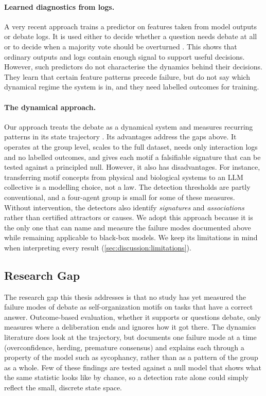 \paragraph{Learned diagnostics from logs.}
A very recent approach trains a predictor on features taken from model outputs
or debate logs. It is used either to decide whether a question needs debate at all
\citep{fan2026imad} or to decide when a majority vote should be overturned
\citep{minoritysentinel2026}. This shows that ordinary outputs and logs contain enough signal
to support useful decisions. However, such predictors do not characterise the
dynamics behind their decisions. They learn that certain feature patterns precede failure, but do not
say which dynamical regime the system is in, and they need labelled outcomes for
training.

\paragraph{The dynamical approach.}
Our approach treats the debate as a dynamical system and measures
recurring patterns in its state trajectory \citep{strogatz2015nonlinear,
driscoll2024dynamical}. Its advantages address the gaps above. It operates at the
group level, scales to the full dataset, needs only interaction logs and no
labelled outcomes, and gives each motif a falsifiable signature that can be tested
against a principled null. However, it also has disadvantages. For instance,
transferring motif concepts from physical and biological systems to an \ac{LLM}
collective is a modelling choice, not a law. The detection thresholds are partly
conventional, and a four-agent group is small for some of these measures. Without
intervention, the detectors also identify \emph{signatures} and
\emph{associations} rather than certified attractors or causes. We adopt this
approach because it is the only one that can name and measure the failure modes
documented above while remaining applicable to black-box models. We keep its
limitations in mind when interpreting every result (\autoref{sec:discussion:limitations}).

\subsection{Research Gap}
\label{sec:related:gap}

The research gap this thesis addresses is that no study has yet measured the
failure modes of debate as self-organization motifs on tasks that have a correct
answer.
Outcome-based evaluation, whether it supports or questions debate,
only measures where a deliberation ends and ignores how it got there. The
dynamics literature does look at the trajectory, but documents one failure mode
at a time (overconfidence, herding, premature consensus) and explains each
through a property of the model such as sycophancy, rather than as a pattern of
the group as a whole.
Few of these findings are tested against a null model that shows what the same
statistic looks like by chance, so a detection rate alone could simply reflect
the small, discrete state space.

